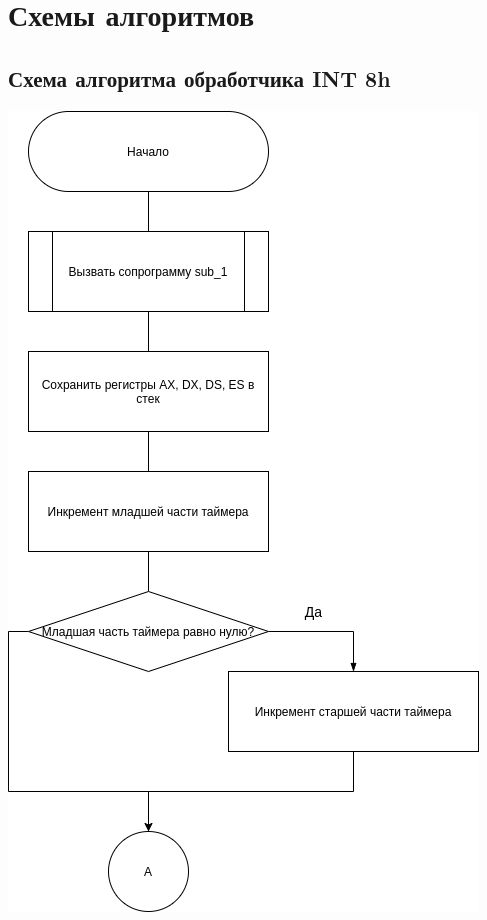 \chapter{Схемы алгоритмов}

  \section{Схема алгоритма обработчика INT 8h}
  
    \begin{center}
      \includegraphics[scale=0.6]{images/scheme-int8h_1.drawio.png}
    \end{center}
    
